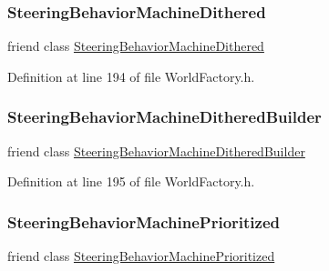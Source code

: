 \subsubsection{\texorpdfstring{Steering\+Behavior\+Machine\+Dithered}{SteeringBehaviorMachineDithered}}
{\footnotesize\ttfamily friend class \mbox{\hyperlink{classnjli_1_1_steering_behavior_machine_dithered}{Steering\+Behavior\+Machine\+Dithered}}\hspace{0.3cm}{\ttfamily [friend]}}



Definition at line 194 of file World\+Factory.\+h.

\mbox{\label{classnjli_1_1_world_factory_a43b5786c14f6970b98e4d107557a9b9c}} 
\subsubsection{\texorpdfstring{Steering\+Behavior\+Machine\+Dithered\+Builder}{SteeringBehaviorMachineDitheredBuilder}}
{\footnotesize\ttfamily friend class \mbox{\hyperlink{classnjli_1_1_steering_behavior_machine_dithered_builder}{Steering\+Behavior\+Machine\+Dithered\+Builder}}\hspace{0.3cm}{\ttfamily [friend]}}



Definition at line 195 of file World\+Factory.\+h.

\mbox{\label{classnjli_1_1_world_factory_afd17df6bd59c939f0d8de6be28d4ccfe}} 
\subsubsection{\texorpdfstring{Steering\+Behavior\+Machine\+Prioritized}{SteeringBehaviorMachinePrioritized}}
{\footnotesize\ttfamily friend class \mbox{\hyperlink{classnjli_1_1_steering_behavior_machine_prioritized}{Steering\+Behavior\+Machine\+Prioritized}}\hspace{0.3cm}{\ttfamily [friend]}}



